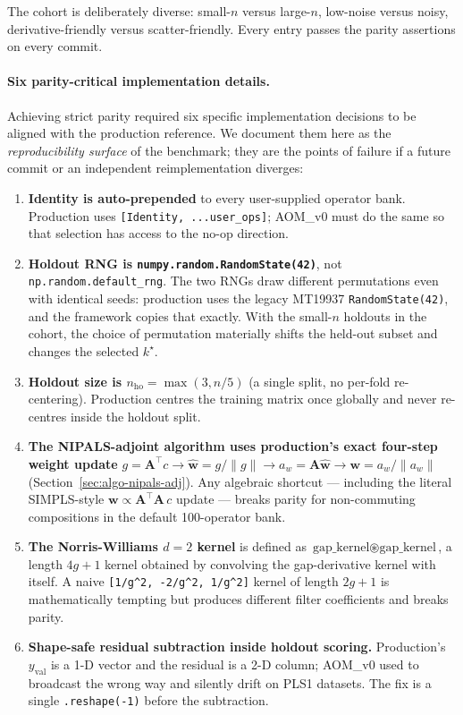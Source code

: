 \documentclass[review,a4paper]{elsarticle}
\newcommand{\Amat}{\mathbf{A}}
\newcommand{\wvec}{\mathbf{w}}
\newcommand{\AOM}{\textsc{AOM}\xspace}
\newcommand{\NIPALS}{\textsc{NIPALS}\xspace}
\newcommand{\SIMPLS}{\textsc{SIMPLS}\xspace}
\begin{document}
The cohort is deliberately diverse: small-$n$ versus large-$n$,
low-noise versus noisy, derivative-friendly versus scatter-friendly.
Every entry passes the parity assertions on every commit.

\paragraph{Six parity-critical implementation details.}
Achieving strict parity required six specific implementation decisions
to be aligned with the production reference. We document them here as
the \emph{reproducibility surface} of the benchmark; they are the
points of failure if a future commit or an independent reimplementation
diverges:

\begin{enumerate}[leftmargin=2em]
  \item \textbf{Identity is auto-prepended} to every user-supplied
        operator bank. Production uses
        \verb|[Identity, ...user_ops]|; \AOM\_v0 must do the same so
        that selection has access to the no-op direction.
  \item \textbf{Holdout RNG is \texttt{numpy.random.RandomState(42)}},
        not \verb|np.random.default_rng|. The two RNGs draw different
        permutations even with identical seeds: production uses the
        legacy MT19937 \verb|RandomState(42)|, and the framework copies
        that exactly. With the small-$n$ holdouts in the cohort, the
        choice of permutation materially shifts the held-out subset
        and changes the selected $k^\star$.
  \item \textbf{Holdout size is $n_\text{ho}=\max(3, n/5)$} (a single
        split, no per-fold re-centering). Production centres the
        training matrix once globally and never re-centres inside the
        holdout split.
  \item \textbf{The \NIPALS-adjoint algorithm uses production's exact
        four-step weight update}
        $g=\Amat^\top c \to \hat{\wvec}=g/\|g\| \to a_w=\Amat\hat{\wvec}
        \to \wvec=a_w/\|a_w\|$ (Section~\ref{sec:algo-nipals-adj}).
        Any algebraic shortcut --- including the literal \SIMPLS-style
        $\wvec\propto\Amat^\top\Amat\,c$ update --- breaks parity for
        non-commuting compositions in the default 100-operator bank.
  \item \textbf{The Norris-Williams $d{=}2$ kernel} is defined as
        $\text{gap\_kernel}\circledast\text{gap\_kernel}$, a length
        $4g{+}1$ kernel obtained by convolving the gap-derivative
        kernel with itself. A naive \texttt{[1/g\^{}2,\,-2/g\^{}2,\,1/g\^{}2]}
        kernel of length $2g{+}1$ is mathematically tempting but
        produces different filter coefficients and breaks parity.
  \item \textbf{Shape-safe residual subtraction inside holdout
        scoring.} Production's $y_\text{val}$ is a 1-D vector and the
        residual is a 2-D column; \AOM\_v0 used to broadcast the
        wrong way and silently drift on PLS1 datasets. The fix is a
        single \verb|.reshape(-1)| before the subtraction.
\end{enumerate}
\end{document}
